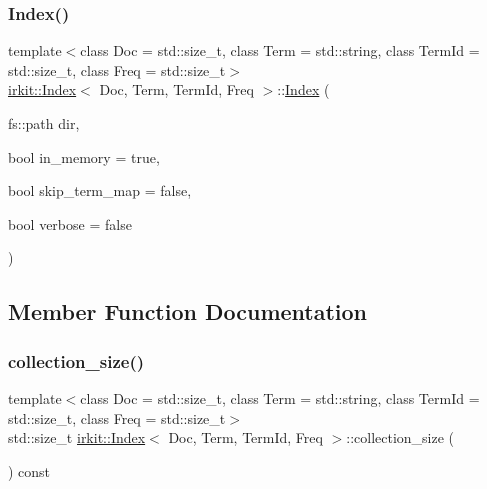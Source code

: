 \mbox{\label{classirkit_1_1Index_a6fade82e666208109ec03fd3409c753b}} 
\subsubsection{\texorpdfstring{Index()}{Index()}\hspace{0.1cm}{\footnotesize\ttfamily [2/2]}}
{\footnotesize\ttfamily template$<$class Doc  = std\+::size\+\_\+t, class Term  = std\+::string, class Term\+Id  = std\+::size\+\_\+t, class Freq  = std\+::size\+\_\+t$>$ \\
\mbox{\hyperlink{classirkit_1_1Index}{irkit\+::\+Index}}$<$ Doc, Term, Term\+Id, Freq $>$\+::\mbox{\hyperlink{classirkit_1_1Index}{Index}} (\begin{DoxyParamCaption}\item[{fs\+::path}]{dir,  }\item[{bool}]{in\+\_\+memory = {\ttfamily true},  }\item[{bool}]{skip\+\_\+term\+\_\+map = {\ttfamily false},  }\item[{bool}]{verbose = {\ttfamily false} }\end{DoxyParamCaption})\hspace{0.3cm}{\ttfamily [inline]}}



\subsection{Member Function Documentation}
\mbox{\label{classirkit_1_1Index_a45ede4e9e43c8a813d13467d97c084a1}} 
\subsubsection{\texorpdfstring{collection\+\_\+size()}{collection\_size()}}
{\footnotesize\ttfamily template$<$class Doc  = std\+::size\+\_\+t, class Term  = std\+::string, class Term\+Id  = std\+::size\+\_\+t, class Freq  = std\+::size\+\_\+t$>$ \\
std\+::size\+\_\+t \mbox{\hyperlink{classirkit_1_1Index}{irkit\+::\+Index}}$<$ Doc, Term, Term\+Id, Freq $>$\+::collection\+\_\+size (\begin{DoxyParamCaption}{ }\end{DoxyParamCaption}) const\hspace{0.3cm}{\ttfamily [inline]}}

